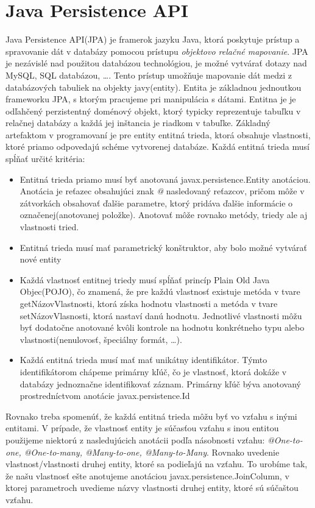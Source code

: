 \section{Java Persistence API}
Java Persistence API(JPA) je framerok jazyku Java, ktorá poskytuje prístup a spravovanie dát v databázy pomocou prístupu \emph{objektovo relačné mapovanie}. JPA je nezávislé nad použitou databázou technológiou, je možné vytvárať dotazy nad MySQL, SQL databázou, \ldots. Tento prístup  umožňuje mapovanie dát medzi  z databázových tabuliek na objekty javy(entity). Entita je základnou jednoutkou frameworku JPA, s ktorým pracujeme pri manipulácia s dátami. Entitna je je odľahčený perzistentný doménový objekt, ktorý typicky reprezentuje tabuľku v relačnej databázy a každá jej inštancia je riadkom v  tabuľke. Základný artefaktom v programovaní je pre entity entitná trieda, ktorá obsahuje vlastnosti, ktoré priamo odpovedajú schéme vytvorenej databáze. Každá entitná trieda musí spĺňať určité kritéria:
\begin{itemize}
\item Entitná trieda priamo musí byť anotovaná javax.persistence.Entity anotáciou. Anotácia je reťazec obsahujúci znak \emph{@} nasledovaný reťazcov, pričom môže v zátvorkách obsahovať ďalšie parametre, ktorý pridáva ďalšie informácie o označenej(anotovanej položke). Anotovať môže rovnako metódy, triedy ale aj vlastnosti tried.
\item Entitná trieda musí mať parametrický konštruktor, aby bolo možné vytvárať nové entity
\item Každá vlastnosť entitnej triedy musí spĺňať princíp Plain Old Java Objec(POJO), čo znamená, že pre každú vlastnosť existuje metóda v tvare getNázovVlastnosti, ktorá získa hodnotu vlastnosti a metóda v tvare setNázovVlasnosti, ktorá nastaví danú hodnotu. Jednotlivé vlastnosti môžu byť dodatočne anotované kvôli kontrole na hodnotu konkrétneho typu alebo vlastnosti(nenulovosť, špeciálny formát, \ldots).
\item Každá entitná trieda musí mať mať unikátny identifikátor. Týmto identifikátorom chápeme primárny kľúč, čo je vlastnosť, ktorá dokáže v databázy jednoznačne identifikovať záznam. Primárny kľúč býva anotovaný prostredníctvom anotácie javax.persistence.Id
\end{itemize}
\newline  \indent Rovnako treba spomenúť, že každá entitná trieda môžu byť vo vzťahu s inými entitami. V prípade, že vlastnosť entity je súčasťou vzťahu s inou entitou použijeme niektorú z nasledujúcich anotácii podľa násobnosti vzťahu: \emph{@One-to-one, @One-to-many, @Many-to-one, @Many-to-Many}. Rovnako uvedenie vlastnost/vlastnosti druhej entity, ktoré sa podieľajú na vzťahu. To urobíme tak, že našu vlastnosť ešte anotujeme anotáciou javax.persistence.JoinColumn, v ktorej parametroch uvedieme názvy vlastnosti druhej entity, ktoré sú súčaštou vzťahu.

